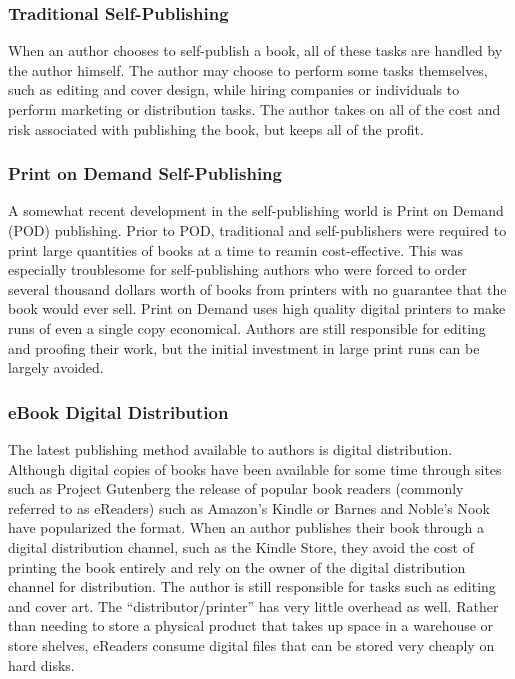 \documentclass[11pt]{article}
\begin{document}
\begin{multicols}{2}
\subsubsection{Traditional Self-Publishing}

When an author chooses to self-publish a book, all of these tasks are handled by the author himself.  The author may choose to perform some tasks themselves, such as editing and cover design, while hiring companies or individuals to perform marketing or distribution tasks. The author takes on all of the cost and risk associated with publishing the book, but keeps all of the profit.

\subsubsection{Print on Demand Self-Publishing}

A somewhat recent development in the self-publishing world is Print on Demand  (POD) publishing.  Prior to POD, traditional and self-publishers were required to print large quantities of books at a time to reamin cost-effective. This was especially troublesome for self-publishing authors who were forced to order several thousand dollars worth of books \cite{EHowSelfPub} from printers with no guarantee that the book would ever sell.  Print on Demand uses high quality digital printers to make runs of even a single copy economical. Authors are still responsible for editing and proofing their work, but the initial investment in large print runs can be largely avoided.

\subsubsection{eBook Digital Distribution}

The latest publishing method available to authors is digital distribution.  Although digital copies of books have been available for some time through sites such as Project Gutenberg \cite{ProjectGutenberg} the release of popular book readers (commonly referred to as eReaders) such as Amazon's Kindle or Barnes and Noble's Nook have popularized the format.  When an author publishes their book through a digital distribution channel, such as the Kindle Store, they avoid the cost of printing the book entirely and rely on the owner of the digital distribution channel for distribution.  The author is still responsible for tasks such as editing and cover art.  The ``distributor/printer'' has very little overhead as well.  Rather than needing to store a physical product that takes up space in a warehouse or store shelves, eReaders consume digital files that can be stored very cheaply on hard disks.


\end{multicols}
\end{document}
